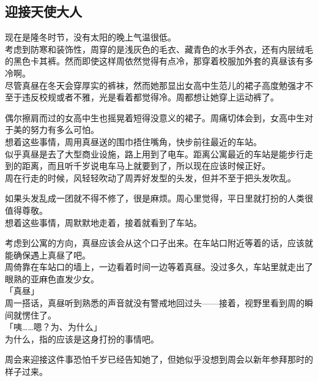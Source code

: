\subsection{迎接天使大人}

现在是隆冬时节，没有太阳的晚上气温很低。\\

考虑到防寒和装饰性，周穿的是浅灰色的毛衣、藏青色的水手外衣，还有内层绒毛的黑色卡其裤。然而即使这样周依然觉得有点冷，那穿着校服加外套的真昼该有多冷啊。\\

尽管真昼在冬天会穿厚实的裤袜，然而她那显出女高中生范儿的裙子高度勉强才不至于违反校规或者不雅，光是看着都觉得冷。周都想让她穿上运动裤了。

偶尔擦肩而过的女高中生也摇晃着短得没意义的裙子。周痛切体会到，女高中生对于美的努力有多么可怕。\\

想着这些事情，周用真昼送的围巾捂住嘴角，快步前往最近的车站。\\

似乎真昼是去了大型商业设施，路上用到了电车。距离公寓最近的车站是能步行走到的距离，而且听千岁说电车马上就要到了，所以现在应该时候正好。\\

周在行走的时候，风轻轻吹动了周弄好发型的头发，但并不至于把头发吹乱。

如果头发乱成一团就不得不修了，很是麻烦。周心里觉得，平日里就打扮的人类很值得尊敬。\\

想着这些事情，周默默地走着，接着就看到了车站。

考虑到公寓的方向，真昼应该会从这个口子出来。在车站口附近等着的话，应该就能确保遇上真昼了吧。\\

周倚靠在车站口的墙上，一边看着时间一边等着真昼。没过多久，车站里就走出了眼熟的亚麻色直发少女。\\

「真昼」\\

周一搭话，真昼听到熟悉的声音就没有警戒地回过头——接着，视野里看到周的瞬间就愣住了。\\

「咦……嗯？为、为什么」\\

为什么，指的应该是这身打扮的事情吧。

周会来迎接这件事恐怕千岁已经告知她了，但她似乎没想到周会以新年参拜那时的样子过来。\\

